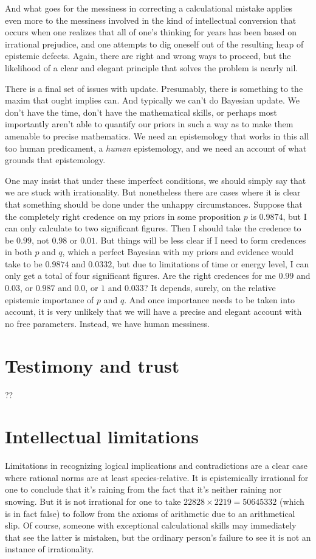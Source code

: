 And what goes for the messiness in correcting a calculational mistake applies even more to the messiness involved in
the kind of intellectual conversion that occurs when one realizes that all of one's thinking for years has been based
on irrational prejudice, and one attempts to dig oneself out of the resulting heap of epistemic defects. Again, there
are right and wrong ways to proceed, but the likelihood of a clear and elegant principle that solves the problem is
nearly nil. 

There is a final set of issues with update. Presumably, there is something to the maxim that ought implies can. And typically 
we can't do Bayesian update. We don't have the time, don't have the mathematical skills, or perhaps most importantly aren't 
able to quantify our priors in such a way as to make them amenable to precise mathematics. We need an epistemology that 
works in this all too human predicament, a \textit{human} epistemology, and we need an account of what grounds that 
epistemology. 

One may insist that under these imperfect conditions, we should simply say that we are stuck with irrationality.
But nonetheless there are cases where it is clear that something should be done under the unhappy circumstances.
Suppose that the completely right credence on my priors in some proposition $p$ is $0.9874$, 
but I can only calculate to two significant figures. Then I should take the credence to be $0.99$, not $0.98$ or 
$0.01$. But things will be less clear if I need to form credences in both $p$ and $q$, which a perfect Bayesian
with my priors and evidence would take to be $0.9874$ and $0.0332$, but due to limitations of
time or energy level, I can only get a total of four significant figures. Are the right credences for me $0.99$
and $0.03$, or $0.987$ and $0.0$, or $1$ and $0.033$? It depends, surely, on the relative epistemic importance of $p$ and
$q$. And once importance needs to be taken into account, it is very unlikely that we will have a precise and elegant
account with no free parameters. Instead, we have human messiness.


\section{Testimony and trust}
??

\section{Intellectual limitations}
Limitations in recognizing logical implications and contradictions are a clear case where rational norms are at
least species-relative. It is epistemically irrational for one to conclude that it's raining from the fact that it's neither 
raining nor snowing. But it is not irrational for one to take $22828 \times 2219 = 50645332$ (which is in fact
false) to follow from the axioms of arithmetic due to an arithmetical slip. Of course, someone with 
exceptional calculational skills may immediately that see the latter is mistaken, but the ordinary person's failure to see it is 
not an instance of irrationality. 

